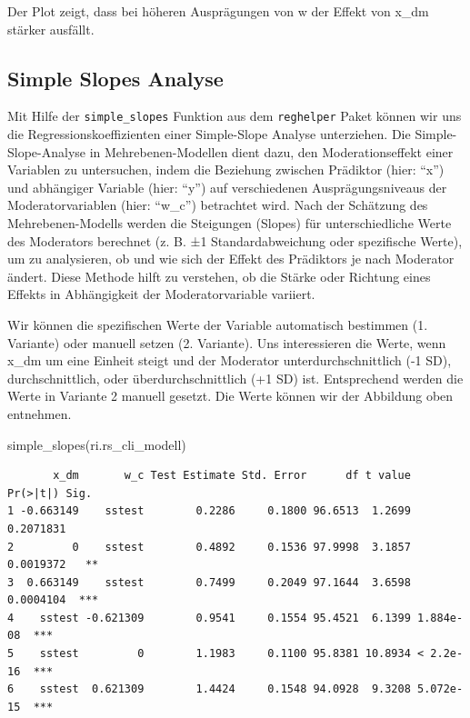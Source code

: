 \documentclass[
  letterpaper,
  DIV=11,
  numbers=noendperiod]{scrreprt}
\newenvironment{Shaded}{\begin{snugshade}}{\end{snugshade}}
\newcommand{\FunctionTok}[1]{\textcolor[rgb]{0.28,0.35,0.67}{#1}}
\newcommand{\NormalTok}[1]{\textcolor[rgb]{0.00,0.23,0.31}{#1}}
\begin{document}
Der Plot zeigt, dass bei höheren Ausprägungen von w der Effekt von x\_dm
stärker ausfällt.

\subsection{Simple Slopes Analyse}\label{simple-slopes-analyse}

Mit Hilfe der \texttt{simple\_slopes} Funktion aus dem
\texttt{reghelper} Paket können wir uns die Regressionskoeffizienten
einer Simple-Slope Analyse unterziehen. Die Simple-Slope-Analyse in
Mehrebenen-Modellen dient dazu, den Moderationseffekt einer Variablen zu
untersuchen, indem die Beziehung zwischen Prädiktor (hier: ``x'') und
abhängiger Variable (hier: ``y'') auf verschiedenen Ausprägungsniveaus
der Moderatorvariablen (hier: ``w\_c'') betrachtet wird. Nach der
Schätzung des Mehrebenen-Modells werden die Steigungen (Slopes) für
unterschiedliche Werte des Moderators berechnet (z. B. ±1
Standardabweichung oder spezifische Werte), um zu analysieren, ob und
wie sich der Effekt des Prädiktors je nach Moderator ändert. Diese
Methode hilft zu verstehen, ob die Stärke oder Richtung eines Effekts in
Abhängigkeit der Moderatorvariable variiert.

Wir können die spezifischen Werte der Variable automatisch bestimmen (1.
Variante) oder manuell setzen (2. Variante). Uns interessieren die
Werte, wenn x\_dm um eine Einheit steigt und der Moderator
unterdurchschnittlich (-1 SD), durchschnittlich, oder
überdurchschnittlich (+1 SD) ist. Entsprechend werden die Werte in
Variante 2 manuell gesetzt. Die Werte können wir der Abbildung oben
entnehmen.

\begin{Shaded}
\begin{Highlighting}[]
\FunctionTok{simple\_slopes}\NormalTok{(ri.rs\_cli\_modell)}
\end{Highlighting}
\end{Shaded}

\begin{verbatim}
       x_dm       w_c Test Estimate Std. Error      df t value  Pr(>|t|) Sig.
1 -0.663149    sstest        0.2286     0.1800 96.6513  1.2699 0.2071831     
2         0    sstest        0.4892     0.1536 97.9998  3.1857 0.0019372   **
3  0.663149    sstest        0.7499     0.2049 97.1644  3.6598 0.0004104  ***
4    sstest -0.621309        0.9541     0.1554 95.4521  6.1399 1.884e-08  ***
5    sstest         0        1.1983     0.1100 95.8381 10.8934 < 2.2e-16  ***
6    sstest  0.621309        1.4424     0.1548 94.0928  9.3208 5.072e-15  ***
\end{verbatim}
\end{document}
